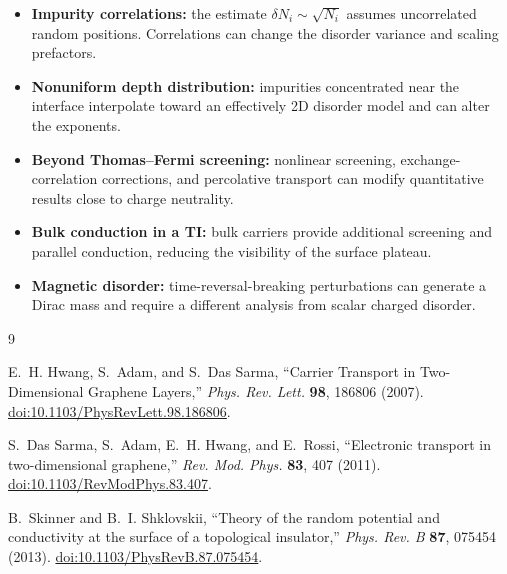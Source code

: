 \documentclass[11pt]{article}
\begin{document}
\begin{itemize}[leftmargin=1.4em,itemsep=0.35em]
    \item \textbf{Impurity correlations:} the estimate $\delta N_i\sim\sqrt{N_i}$ assumes uncorrelated random positions. Correlations can change the disorder variance and scaling prefactors.

    \item \textbf{Nonuniform depth distribution:} impurities concentrated near the interface interpolate toward an effectively 2D disorder model and can alter the exponents.

    \item \textbf{Beyond Thomas--Fermi screening:} nonlinear screening, exchange-correlation corrections, and percolative transport can modify quantitative results close to charge neutrality.

    \item \textbf{Bulk conduction in a TI:} bulk carriers provide additional screening and parallel conduction, reducing the visibility of the surface plateau.

    \item \textbf{Magnetic disorder:} time-reversal-breaking perturbations can generate a Dirac mass and require a different analysis from scalar charged disorder.
\end{itemize}

\begin{thebibliography}{9}

E.~H. Hwang, S.~Adam, and S.~Das Sarma,
``Carrier Transport in Two-Dimensional Graphene Layers,''
\emph{Phys. Rev. Lett.} \textbf{98}, 186806 (2007).
\href{https://doi.org/10.1103/PhysRevLett.98.186806}
{doi:10.1103/PhysRevLett.98.186806}.

S.~Das Sarma, S.~Adam, E.~H. Hwang, and E.~Rossi,
``Electronic transport in two-dimensional graphene,''
\emph{Rev. Mod. Phys.} \textbf{83}, 407 (2011).
\href{https://doi.org/10.1103/RevModPhys.83.407}
{doi:10.1103/RevModPhys.83.407}.

B.~Skinner and B.~I. Shklovskii,
``Theory of the random potential and conductivity at the surface of a topological insulator,''
\emph{Phys. Rev. B} \textbf{87}, 075454 (2013).
\href{https://doi.org/10.1103/PhysRevB.87.075454}
{doi:10.1103/PhysRevB.87.075454}.

\end{thebibliography}
\end{document}
